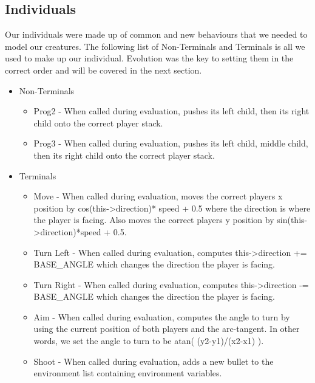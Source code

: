 \documentclass{acm_proc_article-sp}
\begin{document}
\subsection{Individuals} %
Our individuals were made up of common and new behaviours that we needed to model our creatures. The following list of Non-Terminals and Terminals is all we used to make up our individual. Evolution was the key to setting them in the correct order and will be covered in the next section.
\begin{itemize}
\item Non-Terminals
	\begin{itemize}
	\item Prog2 - When called during evaluation, pushes its left child, then its right child onto the correct player stack.
	\item Prog3 - When called during evaluation, pushes its left child, middle child, then its right child onto the correct player stack.
	\end{itemize}
\item Terminals
	\begin{itemize}
	\item Move - When called during evaluation, moves the correct players x position by cos(this->direction)* speed + 0.5 where the direction is where the player is facing. Also moves the correct players y position by sin(this->direction)*speed + 0.5.
	\item Turn Left - When called during evaluation, computes this->direction += BASE\_ANGLE which changes the direction the player is facing.
	\item Turn Right - When called during evaluation, computes this->direction -= BASE\_ANGLE which changes the direction the player is facing.
	\item Aim - When called during evaluation, computes the angle to turn by using the current position of both players and the arc-tangent. In other words, we set the angle to turn to be atan( (y2-y1)/(x2-x1) ).
	\item Shoot - When called during evaluation, adds a new bullet to the environment list containing environment variables.
	\end{itemize}
\end{itemize}
\end{document}
